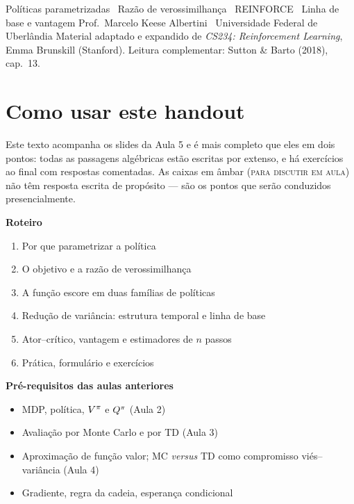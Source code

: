 \documentclass[11pt]{article}
\begin{document}
     {Políticas parametrizadas \textbullet\ Razão de verossimilhança \textbullet\
      REINFORCE \textbullet\ Linha de base e vantagem}
     {Prof.\ Marcelo Keese Albertini \textbullet\ Universidade Federal de Uberlândia}
     {Material adaptado e expandido de \textit{CS234: Reinforcement Learning},
      Emma Brunskill (Stanford). Leitura complementar: Sutton \& Barto (2018), cap.\ 13.}

\section*{Como usar este handout}

Este texto acompanha os slides da Aula 5 e é mais completo que eles em dois pontos:
todas as passagens algébricas estão escritas por extenso, e há exercícios ao final
com respostas comentadas. As caixas em âmbar (\textsc{para discutir em aula}) não
têm resposta escrita de propósito --- são os pontos que serão conduzidos
presencialmente.

\medskip
\noindent
\begin{minipage}[t]{0.5\linewidth}
\textbf{Roteiro}
\begin{enumerate}[itemsep=0.05em]
  \item Por que parametrizar a política
  \item O objetivo e a razão de verossimilhança
  \item A função escore em duas famílias de políticas
  \item Redução de variância: estrutura temporal e linha de base
  \item Ator--crítico, vantagem e estimadores de $n$ passos
  \item Prática, formulário e exercícios
\end{enumerate}
\end{minipage}\hfill
\begin{minipage}[t]{0.46\linewidth}
\textbf{Pré-requisitos das aulas anteriores}
\begin{itemize}[itemsep=0.05em]
  \item MDP, política, $V^{\pi}$ e $Q^{\pi}$ (Aula 2)
  \item Avaliação por Monte Carlo e por TD (Aula 3)
  \item Aproximação de função valor; MC \emph{versus} TD como compromisso
        viés--variância (Aula 4)
  \item Gradiente, regra da cadeia, esperança condicional
\end{itemize}
\end{minipage}
\end{document}
